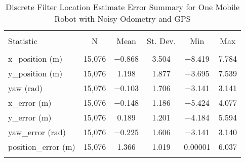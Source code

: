 
\begin{table}[htbp] \centering 
  \caption{Discrete Filter Location Estimate Error Summary for One Mobile Robot with Noisy Odometry and GPS} 
  \label{tab:one_mobile_discrete_summary} 
\begin{tabular}{@{\extracolsep{5pt}}lccccc} 
\\[-1.8ex]\hline 
\hline \\[-1.8ex] 
Statistic & \multicolumn{1}{c}{N} & \multicolumn{1}{c}{Mean} & \multicolumn{1}{c}{St. Dev.} & \multicolumn{1}{c}{Min} & \multicolumn{1}{c}{Max} \\ 
\hline \\[-1.8ex] 
x\_position (m) & 15,076 & \num{-0.868} & \num{3.504} & \num{-8.419} & \num{7.784} \\ 
y\_position (m) & 15,076 & \num{1.198} & \num{1.877} & \num{-3.695} & \num{7.539} \\ 
yaw (rad) & 15,076 & \num{-0.103} & \num{1.706} & \num{-3.141} & \num{3.141} \\ 
x\_error (m) & 15,076 & \num{-0.148} & \num{1.186} & \num{-5.424} & \num{4.077} \\ 
y\_error (m) & 15,076 & \num{0.189} & \num{1.201} & \num{-4.184} & \num{5.594} \\ 
yaw\_error (rad) & 15,076 & \num{-0.225} & \num{1.606} & \num{-3.141} & \num{3.140} \\ 
position\_error (m) & 15,076 & \num{1.366} & \num{1.019} & \num{0.00001} & \num{6.037} \\ 
\hline \\[-1.8ex] 
\end{tabular} 
\end{table} 
